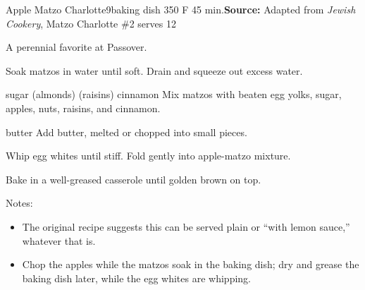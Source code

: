\begin{recipe}{Apple Matzo Charlotte}{9\inch{}\inch baking dish \hfill 350\0 F \hfill 45 min.}{\textbf{Source:} Adapted from \textit{Jewish Cookery}, Matzo Charlotte \#2 \hfill serves 12}

 \freeform A perennial favorite at Passover.

 Soak matzos in water until soft. Drain and squeeze out excess water.

  {sugar}
  {(almonds)}
  {(raisins)}
  {cinnamon}
 Mix matzos with beaten egg yolks, sugar, apples, nuts, raisins, and cinnamon.

  {butter}
 Add butter, melted or chopped into small pieces.

 Whip egg whites until stiff. Fold gently into apple-matzo mixture.

 \newstep Bake in a well-greased casserole until golden brown on top.

 \freeform Notes:
 \begin{itemize}
  \item The original recipe suggests this can be served plain or ``with lemon sauce,'' whatever that is.
  \item Chop the apples while the matzos soak in the baking dish; dry and grease the baking dish later, while the egg whites are whipping.
 \end{itemize}
\end{recipe}
